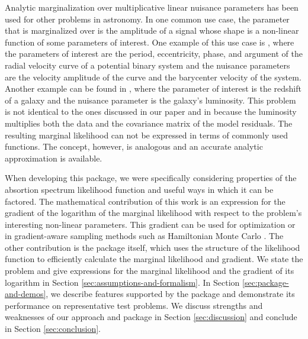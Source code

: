 \documentclass[manuscript]{aastex62}
\begin{document}
Analytic marginalization over multiplicative linear nuisance parameters has been used for other problems in astronomy.
In one common use case, the parameter that is marginalized over is the amplitude of a signal whose shape is a non-linear function of some parameters of interest.
One example of this use case is \citet{2017ApJ...837...20P}, where the parameters of interest are the period, eccentricity, phase, and argument of the radial velocity curve of a potential binary system and the nuisance parameters are the velocity amplitude of the curve and the barycenter velocity of the system.
Another example can be found in \citet{Leistedt:2017in}, where the parameter of interest is the redshift of a galaxy  and the nuisance parameter is the galaxy's luminosity.
This problem is not identical to the ones discussed in our paper and in \citet{2017ApJ...837...20P} because the luminosity multiplies both the data and the covariance matrix of the model residuals.
The resulting marginal likelihood can not be expressed in terms of commonly used functions.
The concept, however, is analogous and an accurate analytic approximation is available.

When developing this package, we were specifically considering properties of the absortion spectrum likelihood function and useful ways in which it can be factored.
The mathematical contribution of this work is an expression for the gradient of the logarithm of the marginal likelihood with respect to the problem's interesting non-linear parameters.
This gradient can be used for optimization or in gradient-aware sampling methods such as Hamiltonian Monte Carlo \citep{DUANE1987216}.
The other contribution is the package itself, which uses the structure of the likelihood function to efficiently calculate the marginal likelihood and gradient.
We state the problem and give expressions for the marginal likelihood and the gradient of its logarithm in Section \ref{sec:assumptions-and-formalism}.
In Section \ref{sec:package-and-demos}, we describe features supported by the package and demonstrate its performance on representative test problems.
We discuss strengths and weaknesses of our approach and package in Section \ref{sec:discussion} and conclude in Section \ref{sec:conclusion}.
\end{document}
